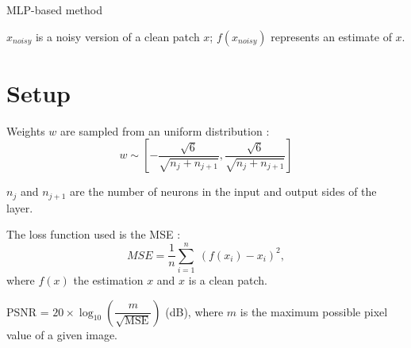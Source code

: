 \documentclass[8pt]{beamer}
\begin{document}
\begin{frame}{MLP-based method}
\begin{figure}[h]
\begin{minipage}[c]{9.5cm}
{
}%
\end{minipage}%
\end{figure}

\vspace{7pt}

$x_{noisy}$ is a noisy version of a clean patch $x$; $f(x_{noisy})$ represents an estimate of $x$.

\end{frame}

\section{Setup}

\begin{frame}
\begin{mybox}
Weights $w$ are sampled from an uniform distribution :  \\%
$$w \sim \left[-\frac{\sqrt{6}}{\sqrt{n_j + n_{j+1}}}, \frac{\sqrt{6}}{\sqrt{n_j + n_{j+1}}}\right]$$

{\footnotesize $n_j$ and $n_{j+1}$ are the number of neurons in the input and output sides of the layer.}
\end{mybox}

\begin{mybox}
The loss function used is the MSE : $$MSE = \frac{1}{n} \sum_{i=1}^{n} \ (f(x_i)-x_i)^2,$$ where $f(x)$ the estimation $x$ and $x$ is a clean patch.
\end{mybox}

\begin{mybox}
PSNR = $20 \times \log_{10}\left(\dfrac{m}{\sqrt{\mathrm{MSE}}} \right)$ (dB), where $m$ is the maximum possible pixel value of a given image.
\end{mybox}
\end{frame}
\end{document}
